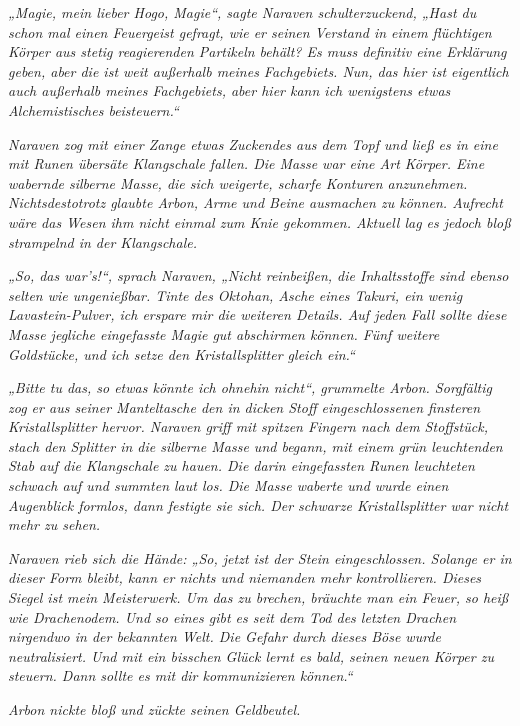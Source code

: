 \textit{„Magie, mein lieber Hogo, Magie“, sagte Naraven schulterzuckend, „Hast du schon mal einen Feuergeist gefragt, wie er seinen Verstand in einem flüchtigen Körper aus stetig reagierenden Partikeln behält? Es muss definitiv eine Erklärung geben, aber die ist weit außerhalb meines Fachgebiets. Nun, das hier ist eigentlich auch außerhalb meines Fachgebiets, aber hier kann ich wenigstens etwas Alchemistisches beisteuern.“}

\textit{Naraven zog mit einer Zange etwas Zuckendes aus dem Topf und ließ es in eine mit Runen übersäte Klangschale fallen. Die Masse war eine Art Körper. Eine wabernde silberne Masse, die sich weigerte, scharfe Konturen anzunehmen. Nichtsdestotrotz glaubte Arbon, Arme und Beine ausmachen zu können. Aufrecht wäre das Wesen ihm nicht einmal zum Knie gekommen. Aktuell lag es jedoch bloß strampelnd in der Klangschale.}

\textit{„So, das war’s!“, sprach Naraven, „Nicht reinbeißen, die Inhaltsstoffe sind ebenso selten wie ungenießbar. Tinte des Oktohan, Asche eines Takuri, ein wenig Lavastein-Pulver, ich erspare mir die weiteren Details. Auf jeden Fall sollte diese Masse jegliche eingefasste Magie gut abschirmen können. Fünf weitere Goldstücke, und ich setze den Kristallsplitter gleich ein.“}

\textit{„Bitte tu das, so etwas könnte ich ohnehin nicht“, grummelte Arbon. Sorgfältig zog er aus seiner Manteltasche den in dicken Stoff eingeschlossenen finsteren Kristallsplitter hervor. Naraven griff mit spitzen Fingern nach dem Stoffstück, stach den Splitter in die silberne Masse und begann, mit einem grün leuchtenden Stab auf die Klangschale zu hauen. Die darin eingefassten Runen leuchteten schwach auf und summten laut los. Die Masse waberte und wurde einen Augenblick formlos, dann festigte sie sich. Der schwarze Kristallsplitter war nicht mehr zu sehen.}

\textit{Naraven rieb sich die Hände: „So, jetzt ist der Stein eingeschlossen. Solange er in dieser Form bleibt, kann er nichts und niemanden mehr kontrollieren. Dieses Siegel ist mein Meisterwerk. Um das zu brechen, bräuchte man ein Feuer, so heiß wie Drachenodem. Und so eines gibt es seit dem Tod des letzten Drachen nirgendwo in der bekannten Welt. Die Gefahr durch dieses Böse wurde neutralisiert. Und mit ein bisschen Glück lernt es bald, seinen neuen Körper zu steuern. Dann sollte es mit dir kommunizieren können.“}

\textit{Arbon nickte bloß und zückte seinen Geldbeutel.}

